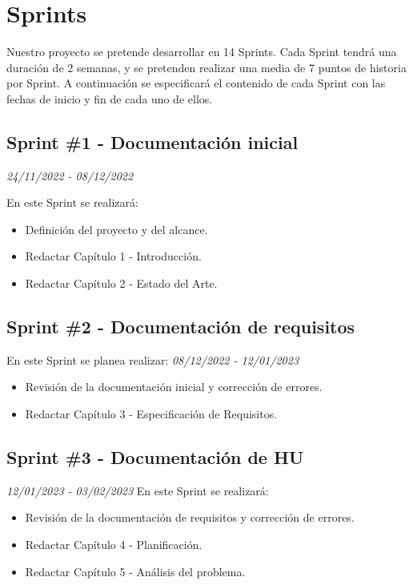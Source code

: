 \section{Sprints}
Nuestro proyecto se pretende desarrollar en 14 Sprints. Cada Sprint tendrá una duración de 2 semanas, y se pretenden realizar una media
de 7 puntos de historia por Sprint. A continuación se especificará el contenido de cada Sprint con las fechas de inicio y fin de cada uno de ellos.

\subsection{Sprint \#1 - Documentación inicial}
\textit{24/11/2022   -   08/12/2022}

En este Sprint se realizará:
\begin{itemize}

    \item Definición del proyecto y del alcance.
    \item Redactar Capítulo 1 - Introducción.
    \item Redactar Capítulo 2 - Estado del Arte.
\end{itemize}
\subsection{Sprint \#2 - Documentación de requisitos}
En este Sprint se planea realizar:
\textit{08/12/2022   -   12/01/2023}
\begin{itemize}
    \item Revisión de la documentación inicial y corrección de errores.
    \item Redactar Capítulo 3 - Especificación de Requisitos.
\end{itemize}

\subsection{Sprint \#3 - Documentación de HU}
\textit{12/01/2023   -   03/02/2023}
En este Sprint se realizará:
\begin{itemize}
    \item Revisión de la documentación de requisitos y corrección de errores.
    \item Redactar Capítulo 4 - Planificación.
    \item Redactar Capítulo 5 - Análisis del problema.
\end{itemize}
